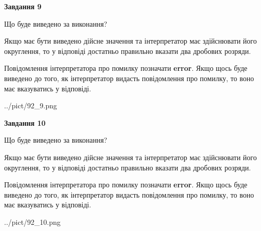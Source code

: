 \documentclass[12pt, ukrainian]{article}
\begin{document}
{\begin {Large}
{\begin {center}\textbf{Завдання 9}\end {center}}\par
Що буде виведено за виконання? \par

Якщо має бути виведено дійсне значення та інтерпретатор має здійснювати його округлення, 
то у відповіді достатньо правильно вказати два дробових розряди.

Повідомлення інтерпретатора про помилку позначати \textbf{error}.
Якщо щось буде виведено до того, як інтерпретатор видасть повідомлення про помилку, 
то воно має вказуватись у відповіді. \par

\begin{center}
	{../pict/92_9.png}
\end{center}
\newpage

{\begin {center}\textbf{Завдання 10}\end {center}}\par
Що буде виведено за виконання? \par

Якщо має бути виведено дійсне значення та інтерпретатор має здійснювати його округлення, 
то у відповіді достатньо правильно вказати два дробових розряди.

Повідомлення інтерпретатора про помилку позначати \textbf{error}.
Якщо щось буде виведено до того, як інтерпретатор видасть повідомлення про помилку, 
то воно має вказуватись у відповіді. \par

\begin{center}
	{../pict/92_10.png}
\end{center}
\newpage

\end {Large}}
\end{document}
